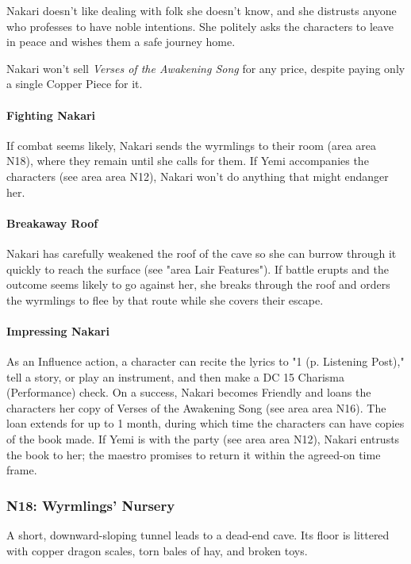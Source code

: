 \documentclass[letterpaper, 11pt, twocolumn]{dndbook}
\begin{document}
Nakari doesn't like dealing with folk she doesn't know, and she distrusts anyone who professes to have noble intentions. She politely asks the characters to leave in peace and wishes them a safe journey home.

Nakari won't sell \textit{Verses of the Awakening Song} for any price, despite paying only a single Copper Piece for it.

\paragraph{Fighting Nakari}

If combat seems likely, Nakari sends the wyrmlings to their room (area area N18), where they remain until she calls for them. If Yemi accompanies the characters (see area area N12), Nakari won't do anything that might endanger her.

\paragraph{Breakaway Roof}

Nakari has carefully weakened the roof of the cave so she can burrow through it quickly to reach the surface (see "area Lair Features"). If battle erupts and the outcome seems likely to go against her, she breaks through the roof and orders the wyrmlings to flee by that route while she covers their escape.

\paragraph{Impressing Nakari}

As an Influence action, a character can recite the lyrics to "1 (p. Listening Post)," tell a story, or play an instrument, and then make a DC 15 Charisma (Performance) check. On a success, Nakari becomes Friendly and loans the characters her copy of Verses of the Awakening Song (see area area N16). The loan extends for up to 1 month, during which time the characters can have copies of the book made. If Yemi is with the party (see area area N12), Nakari entrusts the book to her; the maestro promises to return it within the agreed-on time frame.

\subsubsection{N18: Wyrmlings' Nursery}

\begin{DndReadAloud}
A short, downward-sloping tunnel leads to a dead-end cave. Its floor is littered with copper dragon scales, torn bales of hay, and broken toys.
\end{DndReadAloud}
\end{document}

